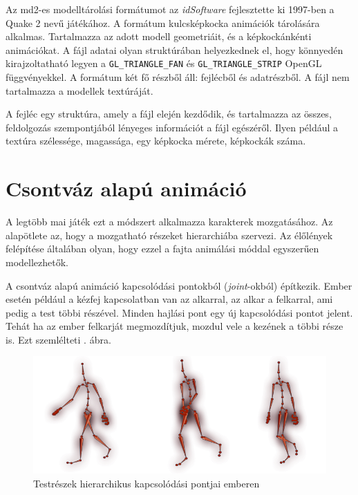 
Az md2-es modelltárolási formátumot az \textit{idSoftware} fejlesztette ki 1997-ben a Quake 2 nevű játékához. A formátum kulcsképkocka animációk tárolására alkalmas. Tartalmazza az adott modell geometriáit, és a képkockánkénti animációkat. A fájl adatai olyan struktúrában helyezkednek el, hogy könnyedén kirajzoltatható legyen a \texttt{GL\_TRIANGLE\_FAN} és \texttt{GL\_TRIANGLE\_STRIP} OpenGL függvényekkel. A formátum két fő részből áll: fejlécből és adatrészből. A fájl nem tartalmazza a modellek textúráját.

A fejléc egy struktúra, amely a fájl elején kezdődik, és tartalmazza az összes, feldolgozás szempontjából lényeges információt a fájl egészéről. Ilyen például a textúra szélessége, magassága, egy képkocka mérete, képkockák száma.

\section{Csontváz alapú animáció}

A legtöbb mai játék ezt a módszert alkalmazza karakterek mozgatásához. Az alapötlete az, hogy a mozgatható részeket hierarchiába szervezi. Az élőlények felépítése általában olyan, hogy ezzel a fajta animálási móddal egyszerűen modellezhetők. 

A csontváz alapú animáció kapcsolódási pontokból (\textit{joint}-okból) építkezik. Ember esetén például a kézfej kapcsolatban van az alkarral, az alkar a felkarral, ami pedig a test többi részével. Minden hajlási pont egy új kapcsolódási pontot jelent. Tehát ha az ember felkarját megmozdítjuk, mozdul vele a kezének a többi része is. Ezt szemlélteti . ábra.

\begin{figure}[h]
\centering
\includegraphics[scale=0.5]{kepek/skeletal_anim.png}
\caption[]{Testrészek hierarchikus kapcsolódási pontjai emberen\footnotemark}
\label{fig:skeletal}
\end{figure}

